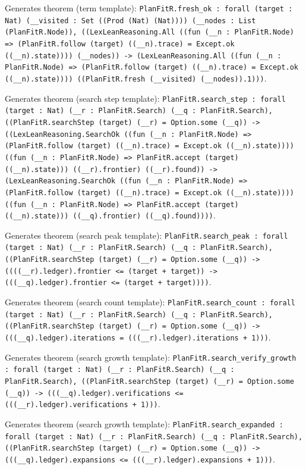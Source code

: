 \documentclass[11pt]{article}
\begin{document}
\noindent Generates theorem (term template): \texttt{PlanFitR.fresh\_ok : forall (target : Nat) (\_\_visited : Set ((Prod (Nat) (Nat)))) (\_\_nodes : List (PlanFitR.Node)), ((LexLeanReasoning.All ((fun (\_\_n : PlanFitR.Node) => (PlanFitR.follow (target) ((\_\_n).trace) = Except.ok ((\_\_n).state)))) (\_\_nodes)) -> (LexLeanReasoning.All ((fun (\_\_n : PlanFitR.Node) => (PlanFitR.follow (target) ((\_\_n).trace) = Except.ok ((\_\_n).state)))) ((PlanFitR.fresh (\_\_visited) (\_\_nodes)).1)))}.\par
\noindent Generates theorem (search step template): \texttt{PlanFitR.search\_step : forall (target : Nat) (\_\_r : PlanFitR.Search) (\_\_q : PlanFitR.Search), ((PlanFitR.searchStep (target) (\_\_r) = Option.some (\_\_q)) -> ((LexLeanReasoning.SearchOk ((fun (\_\_n : PlanFitR.Node) => (PlanFitR.follow (target) ((\_\_n).trace) = Except.ok ((\_\_n).state)))) ((fun (\_\_n : PlanFitR.Node) => PlanFitR.accept (target) ((\_\_n).state))) ((\_\_r).frontier) ((\_\_r).found)) -> (LexLeanReasoning.SearchOk ((fun (\_\_n : PlanFitR.Node) => (PlanFitR.follow (target) ((\_\_n).trace) = Except.ok ((\_\_n).state)))) ((fun (\_\_n : PlanFitR.Node) => PlanFitR.accept (target) ((\_\_n).state))) ((\_\_q).frontier) ((\_\_q).found))))}.\par
\noindent Generates theorem (search peak template): \texttt{PlanFitR.search\_peak : forall (target : Nat) (\_\_r : PlanFitR.Search) (\_\_q : PlanFitR.Search), ((PlanFitR.searchStep (target) (\_\_r) = Option.some (\_\_q)) -> ((((\_\_r).ledger).frontier <= (target + target)) -> (((\_\_q).ledger).frontier <= (target + target))))}.\par
\noindent Generates theorem (search count template): \texttt{PlanFitR.search\_count : forall (target : Nat) (\_\_r : PlanFitR.Search) (\_\_q : PlanFitR.Search), ((PlanFitR.searchStep (target) (\_\_r) = Option.some (\_\_q)) -> (((\_\_q).ledger).iterations = (((\_\_r).ledger).iterations + 1)))}.\par
\noindent Generates theorem (search growth template): \texttt{PlanFitR.search\_verify\_growth : forall (target : Nat) (\_\_r : PlanFitR.Search) (\_\_q : PlanFitR.Search), ((PlanFitR.searchStep (target) (\_\_r) = Option.some (\_\_q)) -> (((\_\_q).ledger).verifications <= (((\_\_r).ledger).verifications + 1)))}.\par
\noindent Generates theorem (search growth template): \texttt{PlanFitR.search\_expanded : forall (target : Nat) (\_\_r : PlanFitR.Search) (\_\_q : PlanFitR.Search), ((PlanFitR.searchStep (target) (\_\_r) = Option.some (\_\_q)) -> (((\_\_q).ledger).expansions <= (((\_\_r).ledger).expansions + 1)))}.\par
\end{document}
